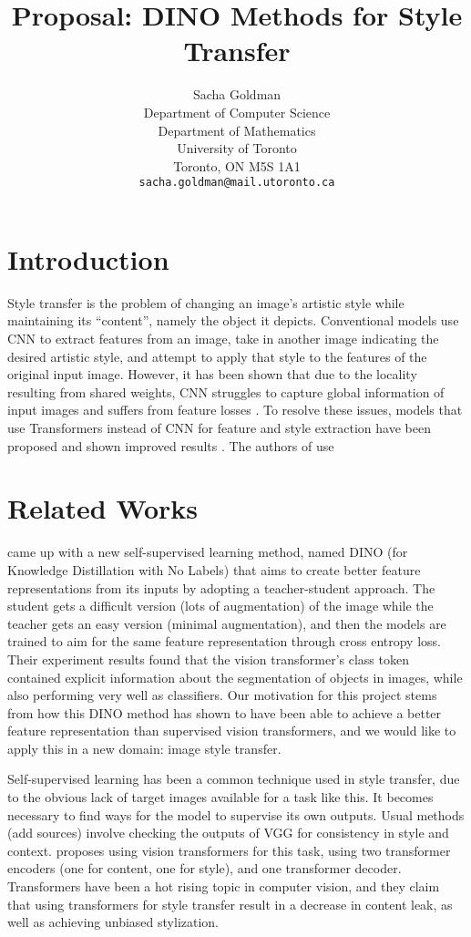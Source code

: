 \documentclass{article}
\title{Proposal: DINO Methods for Style Transfer}
\author{
  Sacha Goldman \\
  Department of Computer Science\\ 
  Department of Mathematics\\
  University of Toronto\\
  Toronto, ON M5S 1A1 \\
  \texttt{sacha.goldman@mail.utoronto.ca} \\
}
\begin{document}
\maketitle

\begin{abstract}

\end{abstract}

\section{Introduction}
Style transfer is the problem of changing an image's artistic style while maintaining its ``content'', namely the object it depicts. Conventional models use CNN to extract features from an image, take in another image indicating the desired artistic style, and attempt to apply that style to the features of the original input image. However, it has been shown that due to the locality resulting from shared weights, CNN struggles to capture global information of input images and suffers from feature losses \cite{ImageStyleTransformer}. To resolve these issues, models that use Transformers instead of CNN for feature and style extraction have been proposed and shown improved results \cite{ImageStyleTransformer}. The authors of \cite{ImageStyleTransformer} use 


\section{Related Works}

\cite{DINO} came up with a new self-supervised learning method, named DINO (for Knowledge Distillation with No Labels) that aims to create better feature representations from its inputs by adopting a teacher-student approach. The student gets a difficult version (lots of augmentation) of the image while the teacher gets an easy version (minimal augmentation), and then the models are trained to aim for the same feature representation through cross entropy loss. Their experiment results found that the vision transformer's class token contained explicit information about the segmentation of objects in images, while also performing very well as classifiers. Our motivation for this project stems from how this DINO method has shown to have been able to achieve a better feature representation than supervised vision transformers, and we would like to apply this in a new domain: image style transfer.

Self-supervised learning has been a common technique used in style transfer, due to the obvious lack of target images available for a task like this. It becomes necessary to find ways for the model to supervise its own outputs. Usual methods (add sources) involve checking the outputs of VGG for consistency in style and context. \cite{ImageStyleTransformer} proposes using vision transformers for this task, using two transformer encoders (one for content, one for style), and one transformer decoder. Transformers have been a hot rising topic in computer vision, and they claim that using transformers for style transfer result in a decrease in content leak, as well as achieving unbiased stylization.
\end{document}
